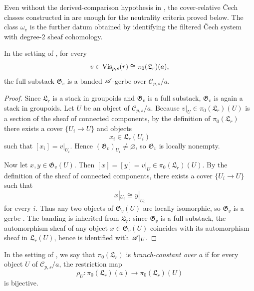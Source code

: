 \begin{remark}\label{rem:cech-derived-level}
Even without the derived-comparison hypothesis in , the cover-relative \v{C}ech classes constructed in  are enough for the neutrality criteria proved below. The class $\omega_v$ is the further datum obtained by identifying the filtered \v{C}ech system with degree-$2$ sheaf cohomology.
\end{remark}

\begin{proposition}\label{thm:component-gerbe-decomposition}
In the setting of , for every
\[
v\in \mathrm{Vis}_{p,s}(r)\cong \pi_0(\mathfrak L_r)(a),
\]
the full substack $\mathfrak G_v$ is a banded $\mathscr{A}$-gerbe over $\mathcal C_{p,s}/a$.
\end{proposition}

\begin{proof}
Since $\mathfrak L_r$ is a stack in groupoids and $\mathfrak G_v$ is a full substack, $\mathfrak G_v$ is again a stack in groupoids. Let $U$ be an object of $\mathcal C_{p,s}/a$. Because $v|_U\in \pi_0(\mathfrak L_r)(U)$ is a section of the sheaf of connected components, by the definition of $\pi_0(\mathfrak L_r)$ there exists a cover $\{U_i\to U\}$ and objects
\[
x_i\in \mathfrak L_r(U_i)
\]
such that $[x_i]=v|_{U_i}$. Hence $(\mathfrak G_v)_{U_i}\neq\varnothing$, so $\mathfrak G_v$ is locally nonempty.

Now let $x,y\in \mathfrak G_v(U)$. Then $[x]=[y]=v|_U\in \pi_0(\mathfrak L_r)(U)$. By the definition of the sheaf of connected components, there exists a cover $\{U_i\to U\}$ such that
\[
x|_{U_i}\cong y|_{U_i}
\]
for every $i$. Thus any two objects of $\mathfrak G_v(U)$ are locally isomorphic, so $\mathfrak G_v$ is a gerbe \cite[Tag 06NY]{StacksProject}. The banding is inherited from $\mathfrak L_r$: since $\mathfrak G_v$ is a full substack, the automorphism sheaf of any object $x\in \mathfrak G_v(U)$ coincides with its automorphism sheaf in $\mathfrak L_r(U)$, hence is identified with $\mathscr{A}|_U$.
\end{proof}

\begin{definition}\label{def:branch-constancy}
In the setting of , we say that $\pi_0(\mathfrak L_r)$ is \emph{branch-constant over $a$} if for every object $U$ of $\mathcal C_{p,s}/a$, the restriction map
\[
\rho_U:\pi_0(\mathfrak L_r)(a)\longrightarrow \pi_0(\mathfrak L_r)(U)
\]
is bijective.
\end{definition}

